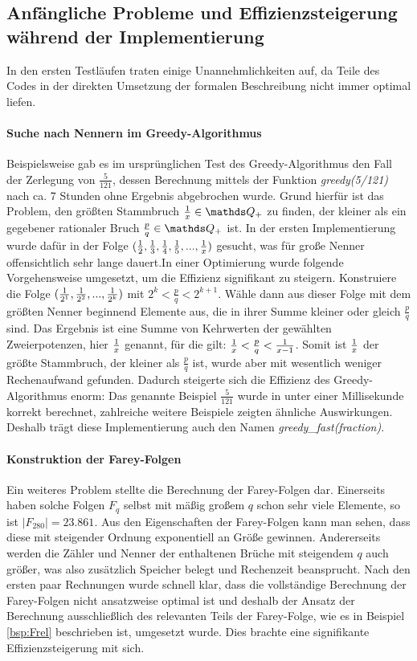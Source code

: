 \subsection{Anfängliche Probleme und Effizienzsteigerung während der Implementierung}
In den ersten Testläufen traten einige Unannehmlichkeiten auf, da Teile des Codes in der direkten Umsetzung der formalen Beschreibung nicht immer optimal liefen.

\paragraph{Suche nach Nennern im Greedy-Algorithmus}Beispielsweise gab es im ursprünglichen Test des Greedy-Algorithmus den Fall der Zerlegung von $\frac{5}{121}$, dessen Berechnung mittels der Funktion \emph{greedy(5/121)} nach ca. 7 Stunden ohne Ergebnis abgebrochen wurde. Grund hierfür ist das Problem, den größten Stammbruch $\uf{x} \in \Q_+$ zu finden, der kleiner als ein gegebener rationaler Bruch $\frac{p}{q} \in \Q_+$ ist. In der ersten Implementierung wurde dafür in der Folge $(\frac{1}{2}, \frac{1}{3}, \frac{1}{4}, \frac{1}{5},...,\frac{1}{x})$ gesucht, was für große Nenner offensichtlich sehr lange dauert.In einer Optimierung wurde folgende Vorgehensweise umgesetzt, um die Effizienz signifikant zu steigern. Konstruiere die Folge $(\frac{1}{2^1}, \frac{1}{2^2}, ..., \frac{1}{2^k})$ mit $2^k < \frac{p}{q} < 2^{k+1}$. Wähle dann aus dieser Folge mit dem größten Nenner beginnend Elemente aus, die in ihrer Summe kleiner oder gleich $\frac{p}{q}$ sind. Das Ergebnis ist eine Summe von Kehrwerten der gewählten Zweierpotenzen, hier $\frac{1}{x}$ genannt, für die gilt: $\frac{1}{x} < \frac{p}{q} < \frac{1}{x-1}$. Somit ist $\frac{1}{x}$ der größte Stammbruch, der kleiner als $\frac{p}{q}$ ist, wurde aber mit wesentlich weniger Rechenaufwand gefunden.
Dadurch steigerte sich die Effizienz des Greedy-Algorithmus enorm: Das genannte Beispiel $\frac{5}{121}$ wurde in unter einer Millisekunde korrekt berechnet, zahlreiche weitere Beispiele zeigten ähnliche Auswirkungen. Deshalb trägt diese Implementierung auch den Namen \emph{greedy\_fast(fraction)}.

\paragraph{Konstruktion der Farey-Folgen}Ein weiteres Problem stellte die Berechnung der Farey-Folgen dar. Einerseits haben solche Folgen $F_q$ selbst mit mäßig großem $q$ schon sehr viele Elemente, so ist \zB $|F_{280}| = 23.861$. Aus den Eigenschaften der Farey-Folgen kann man sehen, dass diese mit steigender Ordnung exponentiell an Größe gewinnen. Andererseits werden die Zähler und Nenner der enthaltenen Brüche mit steigendem $q$ auch größer, was also zusätzlich Speicher belegt und Rechenzeit beansprucht. Nach den ersten paar Rechnungen wurde schnell klar, dass die vollständige Berechnung der Farey-Folgen nicht ansatzweise optimal ist und deshalb der Ansatz der Berechnung ausschließlich des relevanten Teils der Farey-Folge, wie es in Beispiel \ref{bsp:Frel} beschrieben ist, umgesetzt wurde. Dies brachte eine signifikante Effizienzsteigerung mit sich.


